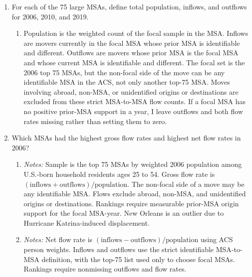 \documentclass{article}
\newcommand{\tabnote}[1]{%
\par\vspace{0.25em}
\begin{minipage}{0.92\textwidth}
\footnotesize \emph{Notes:} #1
\end{minipage}
}
\begin{document}
\begin{enumerate}[leftmargin=*]
\item For each of the 75 large MSAs, define total population, inflows, and outflows for 2006, 2010, and 2019.

\begin{enumerate}[label=(\roman*)]
    \item 

    Population is the weighted count of the focal sample in the MSA. Inflows are movers currently in the focal MSA whose prior MSA is identifiable and different. Outflows are movers whose prior MSA is the focal MSA and whose current MSA is identifiable and different. The focal set is the 2006 top 75 MSAs, but the non-focal side of the move can be any identifiable MSA in the ACS, not only another top-75 MSA. Moves involving abroad, non-MSA, or unidentified origins or destinations are excluded from these strict MSA-to-MSA flow counts. If a focal MSA has no positive prior-MSA support in a year, I leave outflows and both flow rates missing rather than setting them to zero.

\end{enumerate}

\item Which MSAs had the highest gross flow rates and highest net flow rates in 2006?

\begin{enumerate}[label=(\roman*)]
    \item \leavevmode

    \begin{table}[H]
    
    \caption{Top 10 gross flow rates in 2006.}
    \tabnote{Sample is the top 75 MSAs by weighted 2006 population among U.S.-born household residents ages 25 to 54. Gross flow rate is $(\text{inflows}+\text{outflows})/\text{population}$. 
    The non-focal side of a move may be any identifiable MSA. 
    Flows exclude abroad, non-MSA, and unidentified origins or destinations. 
    Rankings require measurable prior-MSA origin support for the focal MSA-year.
    New Orleans is an outlier due to Hurricane Katrina-induced displacement.}
    \end{table}

    \item \leavevmode

    \begin{table}[H]
    
    \caption{Top 10 net flow rates in 2006.}
    \tabnote{Net flow rate is $(\text{inflows}-\text{outflows})/\text{population}$ using ACS person weights. Inflows and outflows use the strict identifiable MSA-to-MSA definition, with the top-75 list used only to choose focal MSAs. Rankings require nonmissing outflows and flow rates.}
    \end{table}


\end{enumerate}
\end{enumerate}
\end{document}
